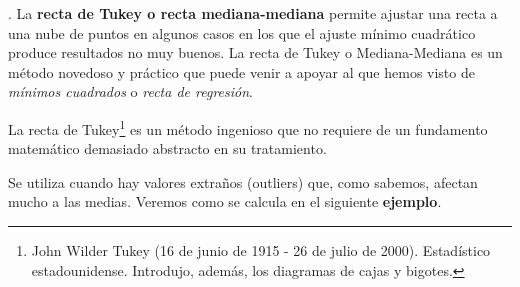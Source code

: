 \begin{definition}
.	\vspace{2mm} La \textbf{recta de Tukey o recta mediana-mediana}	
permite ajustar una recta a una nube de puntos en algunos casos en los que el ajuste mínimo cuadrático produce resultados no muy buenos. La recta de Tukey o Mediana-Mediana es un método novedoso y práctico que puede venir a apoyar al que  hemos visto de  \emph{mínimos cuadrados} o \emph{recta de regresión}.

\vspace{2mm} La recta de Tukey\footnote{John Wilder Tukey (16 de junio de 1915 - 26 de julio de 2000). Estadístico estadounidense. Introdujo, además, los diagramas de cajas y bigotes.} es un método ingenioso que no requiere de un fundamento matemático demasiado abstracto en su tratamiento.

\vspace{2mm} Se utiliza cuando hay valores extraños (outliers) que, como sabemos, afectan mucho a las medias. Veremos como se calcula en el siguiente \textbf{ejemplo}.

\end{definition}

